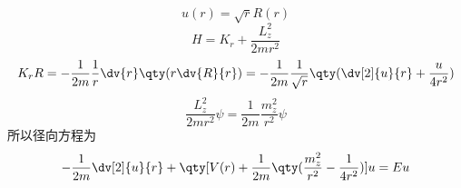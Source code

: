 
\begin{issues}
\issueDraft
\end{issues}


\begin{equation}
u(r) = \sqrt r R(r)
\end{equation}
\begin{equation}
 H = K_r + \frac{L_z^2}{2m r^2}
\end{equation}
\begin{equation}
K_r R = -\frac{1}{2m} \frac1r \dv{r} \qty(r \dv{R}{r}) =  - \frac{1}{2m} \frac{1}{\sqrt r} \qty(\dv[2]{u}{r} + \frac{u}{4 r^2})
\end{equation}
\begin{equation}
\frac{L_z^2}{2m r^2}\psi  = \frac{1}{2m} \frac{m_z^2}{r^2}\psi 
\end{equation}
所以径向方程为
\begin{equation}
- \frac{1}{2m} \dv[2]{u}{r} + \qty[V(r) + \frac{1}{2m} \qty(\frac{m_z^2}{r^2} - \frac{1}{4 r^2})]u = Eu
\end{equation}
